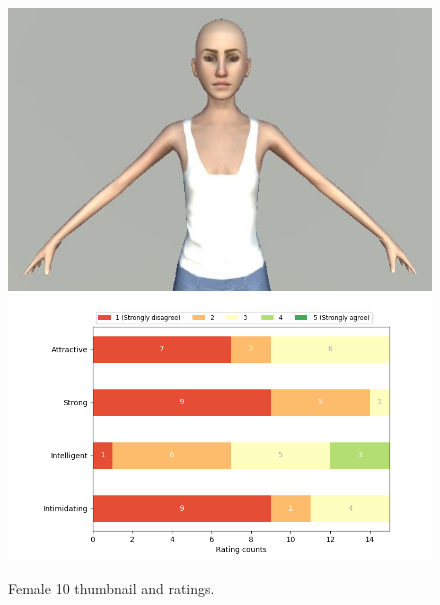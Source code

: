\begin{figure}[H]
  \includegraphics[width=\linewidth]{Images/Females/10.JPG}
\endminipage\hfill
{}
  \includegraphics[width=\linewidth]{Survey/FRatings/avatar_f10.png}
\endminipage\hfill
\caption{Female 10 thumbnail and ratings.}
\end{figure}


